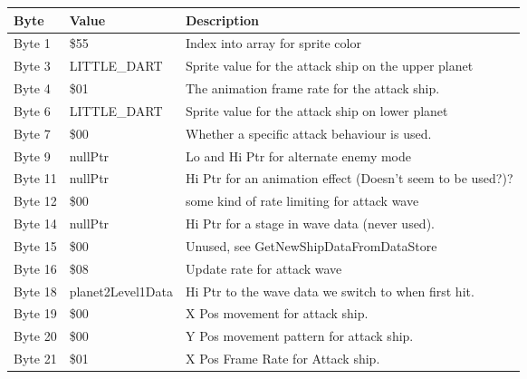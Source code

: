 \begin{figure}[H]
  {
  \setlength{\tabcolsep}{3.0pt}
  \setlength\cmidrulewidth{\heavyrulewidth} %
  \begin{adjustbox}{width=12cm}

\begin{tabular}{lll}
\toprule
 Byte    & Value             & Description                                                        \\
\midrule
 Byte 1  & \$55               & Index into array for sprite color                                  \\
 Byte 3  & LITTLE\_DART       & Sprite value for the attack ship on the upper planet               \\
 Byte 4  & \$01               & The animation frame rate for the attack ship.                      \\
 Byte 6  & LITTLE\_DART       & Sprite value for the attack ship on lower planet                   \\
 Byte 7  & \$00               & Whether a specific attack behaviour is used.                       \\
 Byte 9  & nullPtr           & Lo and Hi Ptr for alternate enemy mode                             \\
 Byte 11 & nullPtr           & Hi Ptr for an animation effect (Doesn't seem to be used?)?         \\
 Byte 12 & \$00               & some kind of rate limiting for attack wave                         \\
 Byte 14 & nullPtr           & Hi Ptr for a stage in wave data (never used).                      \\
 Byte 15 & \$00               & Unused, see GetNewShipDataFromDataStore                            \\
 Byte 16 & \$08               & Update rate for attack wave                                        \\
 Byte 18 & planet2Level1Data & Hi Ptr to the wave data we switch to when first hit.               \\
 Byte 19 & \$00               & X Pos movement for attack ship.                                    \\
 Byte 20 & \$00               & Y Pos movement pattern for attack ship.                            \\
 Byte 21 & \$01               & X Pos Frame Rate for Attack ship.                                  \\

\end{tabular}
\end{adjustbox}}
\end{figure}

